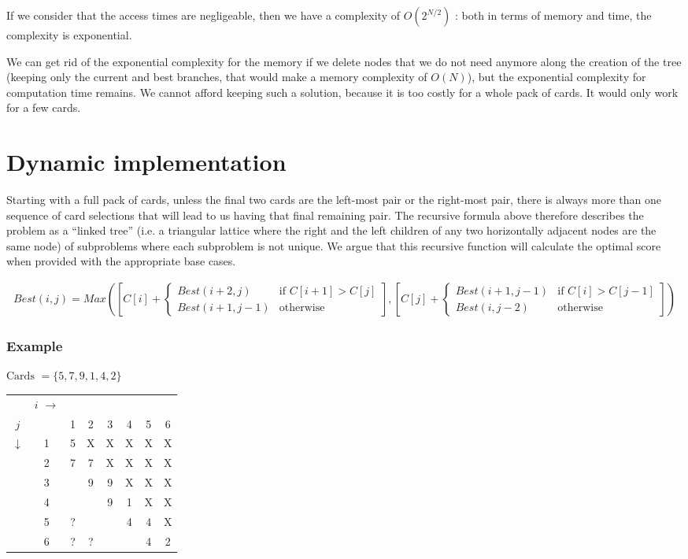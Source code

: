 \documentclass[11pt]{article}
\begin{document}
If we consider that the access times are negligeable, then we have a
complexity of $O(2^{N/2})$ : both in terms of memory and time, the
complexity is exponential.

We can get rid of the exponential complexity for the memory if we delete
nodes that we do not need anymore along the creation of the tree (keeping only
the current and best branches, that would make a memory complexity of $O(N)$), 
but the exponential complexity for computation time remains. 
We cannot afford keeping such a solution, because it is too costly for a whole pack of cards. It would only work for a few cards.

\section{Dynamic implementation}
Starting with a full pack of cards, unless the final two cards are the left-most pair or the right-most pair, there is always more than one sequence of card selections that will lead to us having that final remaining pair. The recursive formula above therefore describes the problem as a ``linked tree'' (i.e. a triangular lattice where 
the right and the left children of any two horizontally adjacent nodes are the same node) of subproblems where each subproblem is not unique. We argue that this recursive function will calculate the optimal score when provided with the appropriate base cases.


\footnotesize
\begin{align*}
	Best(i, j) = Max\left( 
	\left[C[i] +
	\begin{cases}
		Best(i+2,j) & \text{if $C[i+1] > C[j]$} \\
		Best(i+1,j-1) & \text{otherwise}
	\end{cases}
	\right]
	,
	\left[
	C[j] +
	\begin{cases}
		Best(i+1,j-1) & \text{if $C[i] > C[j-1]$} \\
		Best(i,j-2) & \text{otherwise}
	\end{cases}
\right]
	\right)
\end{align*}
\normalsize

\subsubsection*{Example}
	$\text{Cards } = \{5,7,9,1,4,2\}$

	\begin{tabular}[c]{cc|cccccc}
		& $i$ $\rightarrow$\\

		$j$          &   & 1 & 2 & 3 & 4 & 5 & 6 \\
		             \cline{2-8}
		$\downarrow$ & 1 & 5 & X & X & X & X & X \\
		             & 2 & 7 & 7 & X & X & X & X \\
		             & 3 &   & 9 & 9 & X & X & X \\
		             & 4 &   &   & 9 & 1 & X & X \\
		             & 5 & ? &   &   & 4 & 4 & X \\
		             & 6 & ? & ? &   &   & 4 & 2
		
	\end{tabular}
\end{document}
